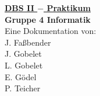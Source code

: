 \documentclass[12pt, twoside]{article}
\begin{document}
\begin{titlepage}
	\begin{center}
    \Huge{\underline{\textbf{DBS II $-$ Praktikum}}}\\
	\vspace{3cm}
		{\Huge{\textbf{Gruppe 4 Informatik}}} \\
	\vspace{3cm}
		{\Huge{Eine Dokumentation von:}} \\
	\vspace{2cm}
		\huge{J. Fa{\ss}bender} \\
	\vspace{.5cm}
		\huge{J. Gobelet} \\
	\vspace{.5cm}
		\huge{L. Gobelet} \\
	\vspace{.5cm}
		\huge{E. G\"odel} \\
  \vspace{.5cm}
    \huge{P. Teicher}
	\end{center}
\end{titlepage}

\tableofcontents
\newpage










\end{document}
